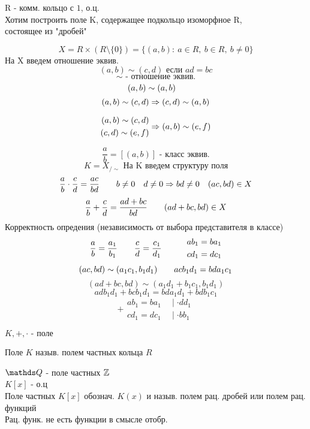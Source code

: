 \documentclass[12pt, fleqn]{article}
\begin{document}
    \begin{definition} 
        R - комм. кольцо с $1$, о.ц.\\
        Хотим построить поле K, содержащее подкольцо изоморфное R, \\ состоящее из "дробей"
    
        \[X = R \times (R \setminus \{0\}) = \{(a, b) : \ a \in R, \  b \in R, \  b \neq 0\}\]
        На X введем отношение эквив.
        \[(a, b) \sim (c, d) \text{ если } ad = bc\]
        \[\sim \text{ - отношение эквив.}\]
        \[(a, b) \sim (a, b) \quad\]
        \[(a, b) \sim (c, d) \Rightarrow (c, d) \sim (a, b)\]

        \[\begin{align}
            (a,b) \sim (c, d)\\
            (c, d) \sim (e, f)
        \end{align}
        \Rightarrow (a, b) \sim (e, f)
        \]

        \[\frac{a}{b} = [(a, b)] \text{ - класс эквив.} \]
        \[K = X_{/\sim} \text{ На K введем структуру поля}\]
        \[\frac{a}{b} \cdot \frac{c}{d} = \frac{ac}{bd} \quad \quad b \neq 0 \quad d \neq 0 \Rightarrow bd \neq 0 \quad (ac, bd) \in X\]
        \[\frac{a}{b} + \frac{c}{d} = \frac{ad + bc}{bd} \quad\quad (ad + bc, bd) \in X\]
        Корректность опредения (независимость от выбора представителя в классе)
        \[\frac{a}{b} = \frac{a_1}{b_1} \quad\quad \frac{c}{d} = \frac{c_1}{d_1} \quad\quad\quad
        \begin{align} 
            ab_1 = ba_1\\
            cd_1 = dc_1
        \end{align}\]
        \[(ac, bd) \sim (a_1 c_1, b_1 d_1) \quad\quad a c b_1 d_1 = bd a_1 c_1\]
        \[(ad + bc, bd) \sim (a_1 d_1 + b_1 c_1, b_1 d_1)\]
        \[ad b_1 d_1 + bc b_1 d_1 = bd a_1 d_1 + bd b_1 c_1\]
        \[+ \begin{align} 
            ab_1 = ba_1 & \ \mid \cdot dd_1\\
            cd_1 = dc_1 & \ \mid \cdot bb_1
        \end{align}\]

        \begin{theorem} 
            $K, +, \cdot \text{ - поле} $
        \end{theorem}

        \begin{definition} 
            Поле $K$ назыв. полем частных кольца $R$
        \end{definition}

        \begin{examples} 
            $\Q$ - поле частных $\mathbb{Z}$\\
            $K[x]$ - о.ц\\
            Поле частных $K[x]$ обознач. $K(x)$ и назыв. полем рац. дробей или полем рац. функций\\
            Рац. функ. не есть функции в смысле отобр.
        \end{examples}
    \end{definition}
\end{document}
